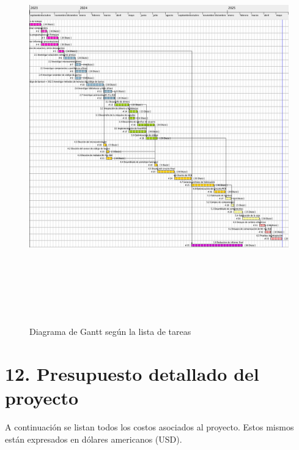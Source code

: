 \documentclass[
11pt, %
codirector, %
]{charter}
\begin{document}
\begin{landscape}
\begin{figure}[htpb]
\centering 
\includegraphics[width=26cm, height=17cm]{./Figuras/Gantt.png}
\caption{Diagrama de Gantt según la lista de tareas}
\label{fig:diagGantt}
\end{figure}

\end{landscape}



\section{12. Presupuesto detallado del proyecto}
\label{sec:presupuesto}

A continuación se listan todos los costos asociados al proyecto. Estos mismos están expresados en dólares americanos (USD).
\end{document}
